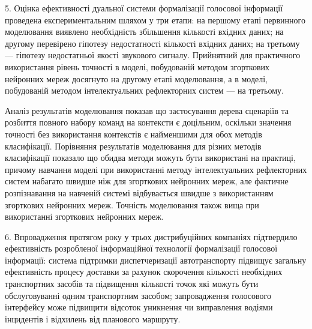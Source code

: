 


5. Оцінка ефективності дуальної системи формалізації голосової інформації проведена експериментальним шляхом у три етапи: на першому етапі первинного моделювання виявлено необхідність збільшення кількості вхідних даних; на другому перевірено гіпотезу недостатності кількості вхідних даних; на третьому --- гіпотезу недостатньої якості звукового сигналу. Прийнятний для практичного використання рівень точності в моделі, побудованій методом згорткових нейронних мереж досягнуто на другому етапі моделювання, а в моделі, побудованій методом інтелектуальних рефлекторних систем --- на третьому.

Аналіз результатів моделювання показав що застосування дерева сценаріїв та розбиття повного набору команд на контексти є доцільним, оскільки значення точності без використання контекстів є найменшими для обох методів класифікації. Порівняння результатів моделювання для різних методів класифікації показало що обидва методи можуть бути використані на практиці, причому навчання моделі при використанні методу інтелектуальних рефлекторних систем набагато швидше ніж для згорткових нейронних мереж, але фактичне розпізнавання на навченій системі відбувається швидше з використанням згорткових нейронних мереж. Точність моделювання також вища при використанні згорткових нейронних мереж.

6. Впровадження протягом року у трьох дистрибуційних компаніях підтвердило ефективність розробленої інформаційної технології формалізації голосової інформації: система підтримки диспетчеризації автотранспорту підвищує загальну ефективність процесу доставки за рахунок скорочення кількості необхідних транспортних засобів та підвищення кількості точок які можуть бути обслуговуванні одним транспортним засобом; запровадження голосового інтерфейсу може підвищити відсоток уникнення чи виправлення водіями інцидентів і відхилень від планового маршруту.

